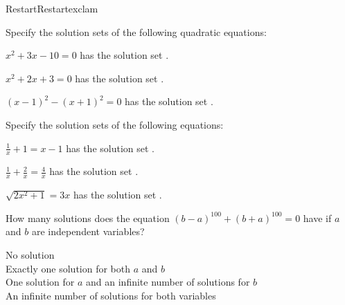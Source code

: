 \begin{MXContent}{Restart}{Restart}{exclam}
\begin{MExercise}
Specify the solution sets of the following quadratic equations:
\begin{MExerciseItems}
\item{$x^2+3x-10=0$ has the solution set .}
\item{$x^2+2x+3=0$ has the solution set .}
\item{$(x-1)^2-(x+1)^2=0$ has the solution set .}
\end{MExerciseItems}
\end{MExercise}


\begin{MExercise}
Specify the solution sets of the following equations:
\begin{MExerciseItems}
\item{$\frac1x+1=x-1$ has the solution set .}
\item{$\frac1x+\frac2x=\frac4x$ has the solution set .}
\item{$\sqrt{2x^2+1}=3x$ has the solution set .}
\end{MExerciseItems}

How many solutions does the equation $(b-a)^{100}+(b+a)^{100}=0$ have if $a$ and $b$ are independent variables?\\
\begin{MQuestionGroup}
 No solution\ \\
 Exactly one solution for both $a$ and $b$\ \\
 One solution for $a$ and an infinite number of solutions for $b$\ \\
 An infinite number of solutions for both variables
\end{MQuestionGroup}\ \\
\end{MExercise}



\end{MXContent}
